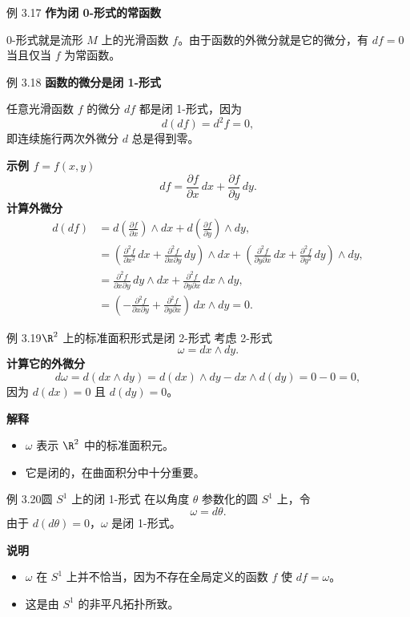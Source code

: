 \begin{statement}{例 3.17}{}
\noindent\textbf{作为闭 0-形式的常函数}\par
0-形式就是流形 $M$ 上的光滑函数 $f$。由于函数的外微分就是它的微分，有 $df=0$ 当且仅当 $f$ 为常函数。%
\end{statement}

\begin{statement}{例 3.18}{}
\noindent\textbf{函数的微分是闭 1-形式}\par
任意光滑函数 $f$ 的微分 $df$ 都是闭 1-形式，因为
\[
  d(df)=d^2f=0,
\]
即连续施行两次外微分 $d$ 总是得到零。

\noindent\textbf{示例 $f=f(x,y)$}
\[
  df=\frac{\partial f}{\partial x}\,dx+\frac{\partial f}{\partial y}\,dy.
\]
\noindent\textbf{计算外微分}
\begin{align*}
  d(df)&=d\!\left(\frac{\partial f}{\partial x}\right)\wedge dx
        +d\!\left(\frac{\partial f}{\partial y}\right)\wedge dy,\\
  &=\left(\frac{\partial^2 f}{\partial x^2}\,dx
          +\frac{\partial^2 f}{\partial x\partial y}\,dy\right)\wedge dx
     +\left(\frac{\partial^2 f}{\partial y\partial x}\,dx
          +\frac{\partial^2 f}{\partial y^2}\,dy\right)\wedge dy,\\
  &=\frac{\partial^2 f}{\partial x\partial y}\,dy\wedge dx
    +\frac{\partial^2 f}{\partial y\partial x}\,dx\wedge dy,\\
  &=\left(-\frac{\partial^2 f}{\partial x\partial y}
     +\frac{\partial^2 f}{\partial y\partial x}\right)\,dx\wedge dy=0.
\end{align*}
\end{statement}

\begin{statement}{例 3.19}{$\R^2$ 上的标准面积形式是闭 2-形式}
考虑 2-形式
\[
  \omega=dx\wedge dy.
\]
\noindent\textbf{计算它的外微分}
\[
  d\omega=d(dx\wedge dy)=d(dx)\wedge dy-dx\wedge d(dy)=0-0=0,
\]
因为 $d(dx)=0$ 且 $d(dy)=0$。

\noindent\textbf{解释}
\begin{itemize}
\item $\omega$ 表示 $\R^2$ 中的标准面积元。
\item 它是闭的，在曲面积分中十分重要。
\end{itemize}
\end{statement}

\begin{statement}{例 3.20}{圆 $S^1$ 上的闭 1-形式}
在以角度 $\theta$ 参数化的圆 $S^1$ 上，令
\[
  \omega=d\theta.
\]
由于 $d(d\theta)=0$，$\omega$ 是闭 1-形式。

\noindent\textbf{说明}
\begin{itemize}
\item $\omega$ 在 $S^1$ 上并不恰当，因为不存在全局定义的函数 $f$ 使 $df=\omega$。
\item 这是由 $S^1$ 的非平凡拓扑所致。
\end{itemize}
\end{statement}

